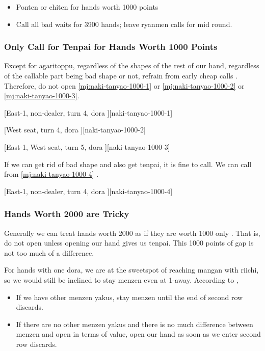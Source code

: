 \documentclass[12pt]{article}
\begin{document}
\begin{itemize}
\item Ponten or chiten for hands worth 1000 points
\item Call all bad waits for 3900 hands; leave ryanmen calls for mid round.
\end{itemize}


\subsubsection*{Only Call for Tenpai for Hands Worth 1000 Points}

Except for agaritoppu, regardless of the shapes of the rest of our hand, regardless of the callable part being bad shape or not, refrain from early cheap calls . Therefore, do not open \ref{mj:naki-tanyao-1000-1} or \ref{mj:naki-tanyao-1000-2} or \ref{mj:naki-tanyao-1000-3}.

[East-1, non-dealer, turn 4, dora ][naki-tanyao-1000-1]

[West seat, turn 4, dora ][naki-tanyao-1000-2]

[East-1, West seat, turn 5, dora ][naki-tanyao-1000-3]

If we can get rid of bad shape and also get tenpai, it is fine to call. We can call  from \ref{mj:naki-tanyao-1000-4} \citep{yoteru-badnaki}.

[East-1, non-dealer, turn 4, dora ][naki-tanyao-1000-4]


\subsubsection*{Hands Worth 2000 are Tricky}

Generally we can treat hands worth 2000 as if they are worth 1000 only \citep[][p.~179]{tetsusenryaku}. That is, do not open unless opening our hand gives us tenpai. This 1000 points of gap is not too much of a difference.

For hands with one dora, we are at the sweetspot of reaching mangan with riichi, so we would still be inclined to stay menzen even at 1-away. According to \citet[][p.~33, p.~38]{hirasawa-naki},

\begin{itemize}
\item If we have other menzen yakus, stay menzen until the end of second row discards.
\item If there are no other menzen yakus and there is no much difference between menzen and open in terms of value, open our hand as soon as we enter second row discards.
\end{itemize}
\end{document}
